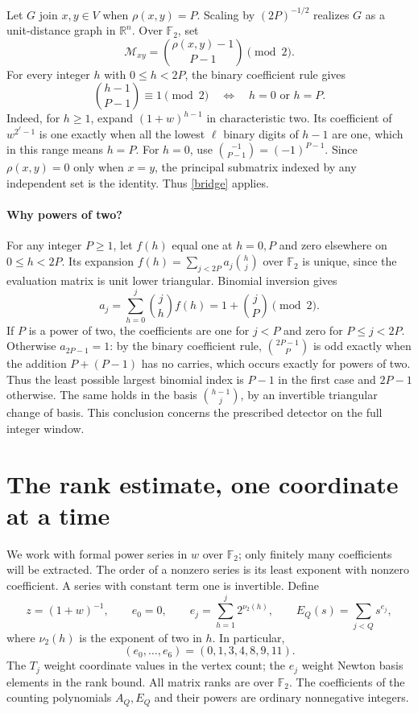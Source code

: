 \documentclass[12pt,a4paper]{article}
\newcommand{\R}{\mathbb R}
\newcommand{\F}{\mathbb F_2}
\begin{document}
Let $G$ join $x,y\in V$ when $\rho(x,y)=P$. Scaling by $(2P)^{-1/2}$ realizes $G$ as a unit-distance graph in $\R^n$. Over $\F$, set
\begin{equation}\label{detecting}
\mathcal M_{xy}=\binom{\rho(x,y)-1}{P-1}\pmod2.
\end{equation}
For every integer $h$ with $0\le h<2P$, the binary coefficient rule gives
\begin{equation}\label{binary}
\binom{h-1}{P-1}\equiv1\pmod2
\quad\Longleftrightarrow\quad h=0\text{ or }h=P.
\end{equation}
Indeed, for $h\ge1$, expand $(1+w)^{h-1}$ in characteristic two. Its coefficient of $w^{2^\ell-1}$ is one exactly when all the lowest $\ell$ binary digits of $h-1$ are one, which in this range means $h=P$. For $h=0$, use $\binom{-1}{P-1}=(-1)^{P-1}$. Since $\rho(x,y)=0$ only when $x=y$, the principal submatrix indexed by any independent set is the identity. Thus \eqref{bridge} applies.

\paragraph{Why powers of two?}
For any integer $P\ge1$, let $f(h)$ equal one at $h=0,P$ and zero elsewhere on $0\le h<2P$. Its expansion $f(h)=\sum_{j<2P}a_j\binom hj$ over $\F$ is unique, since the evaluation matrix is unit lower triangular. Binomial inversion gives
\[
a_j=\sum_{h=0}^j\binom jh f(h)=1+\binom jP\pmod2.
\]
If $P$ is a power of two, the coefficients are one for $j<P$ and zero for $P\le j<2P$. Otherwise $a_{2P-1}=1$: by the binary coefficient rule, $\binom{2P-1}{P}$ is odd exactly when the addition $P+(P-1)$ has no carries, which occurs exactly for powers of two. Thus the least possible largest binomial index is $P-1$ in the first case and $2P-1$ otherwise. The same holds in the basis $\binom{h-1}{j}$, by an invertible triangular change of basis. This conclusion concerns the prescribed detector on the full integer window.

\section{The rank estimate, one coordinate at a time}\label{algebra}
We work with formal power series in $w$ over $\F$; only finitely many coefficients will be extracted. The order of a nonzero series is its least exponent with nonzero coefficient. A series with constant term one is invertible. Define
\begin{equation}\label{degrees}
z=(1+w)^{-1},\qquad e_0=0,\qquad
e_j=\sum_{h=1}^j2^{\nu_2(h)},\qquad E_Q(s)=\sum_{j<Q}s^{e_j},
\end{equation}
where $\nu_2(h)$ is the exponent of two in $h$. In particular,
\[
(e_0,\ldots,e_6)=(0,1,3,4,8,9,11).
\]
The $T_j$ weight coordinate values in the vertex count; the $e_j$ weight Newton basis elements in the rank bound. All matrix ranks are over $\F$. The coefficients of the counting polynomials $A_Q,E_Q$ and their powers are ordinary nonnegative integers.
\end{document}
